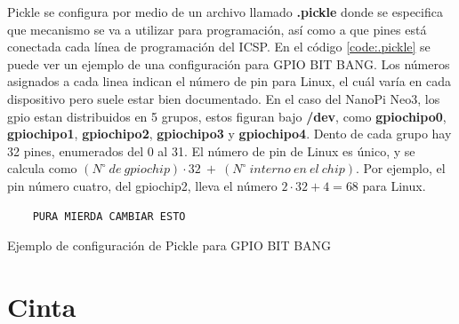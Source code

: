 \documentclass[12pt,letterpaper]{article}     %
\begin{document}
Pickle se configura por medio de un archivo llamado \textbf{.pickle} donde se especifica que mecanismo se va a utilizar 
para programación, así como a que pines está conectada cada línea de programación del ICSP. En el código 
\ref{code:.pickle} se puede ver un ejemplo de una configuración para GPIO BIT BANG.
Los números asignados a cada linea indican el número de pin para Linux, el cuál varía en cada dispositivo pero
suele estar bien documentado. En el caso del NanoPi Neo3, los gpio estan distribuidos en 5 grupos, estos figuran 
bajo \textbf{/dev}, como \textbf{gpiochipo0}, \textbf{gpiochipo1}, \textbf{gpiochipo2}, \textbf{gpiochipo3} y
\textbf{gpiochipo4}. Dento de cada grupo hay 32 pines, enumerados del 0 al 31. El número de pin de Linux es único,
y se calcula como $(N^\circ\ de\ gpiochip)\cdot32\ +\ (N^\circ\ interno\ en\ el\ chip)$. Por ejemplo, el pin número
cuatro, del gpiochip2, lleva el número $2\cdot32+4=68$ para Linux.

\begin{codigo}[!h]
	\begin{lstlisting}
	PURA MIERDA CAMBIAR ESTO
	\end{lstlisting}
	\caption{Ejemplo de configuración de Pickle para GPIO BIT BANG}
	\label{code:.pickle}
\end{codigo}

\section{Cinta}
\end{document}

